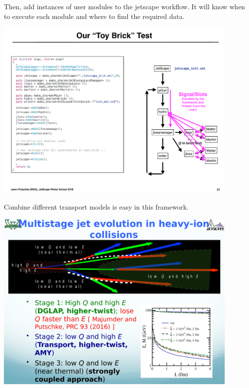 \documentclass[11pt]{beamer}
\begin{document}
\begin{frame}
Then, add instances of user modules to the jetscape workflow. It will know when to execute each module and where to find the required data.
\begin{center}
\includegraphics[width=0.9\textwidth]{./talks/p39.pdf}
\end{center}
\end{frame}

\begin{frame}
Combine different transport models is easy in this framework.
\begin{center}
\includegraphics[width=0.9\textwidth]{./talks/s25.pdf}
\end{center}
\end{frame}
\end{document}
